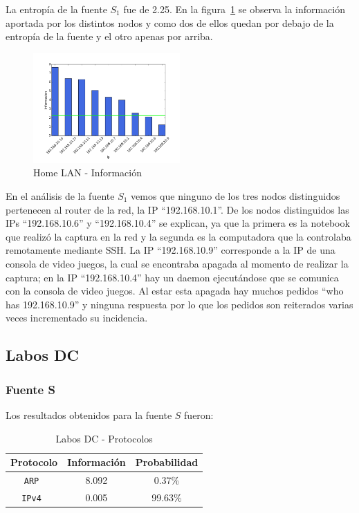 \documentclass[final,inline,narroweqnarray,a4paper]{ieee}
\begin{document}
La entropía de la fuente $S_1$ fue de 2.25. En la figura~\ref{histo:homelanS1} se observa la información aportada por los distintos nodos y como dos de ellos quedan por debajo de la entropía de la fuente y el otro apenas por arriba. 

\begin{figure}[H]
    \begin{center}
        \includegraphics[width=0.5\textwidth]{plot/homelanS1-bar.png}
        \caption{Home LAN - Información}
        \label{histo:homelanS1}
    \end{center}
\end{figure}

En el análisis de la fuente $S_1$ vemos que ninguno de los tres nodos distinguidos pertenecen al router de la red, la IP ``192.168.10.1''. De los nodos distinguidos las IPs ``192.168.10.6'' y ``192.168.10.4'' se explican, ya que la primera es la notebook que realizó la captura en la red y la segunda es la computadora que la controlaba remotamente mediante SSH. La IP ``192.168.10.9'' corresponde a la IP de una consola de video juegos, la cual se encontraba apagada al momento de realizar la captura; en la IP ``192.168.10.4'' hay un daemon ejecutándose que se comunica con la consola de video juegos. Al estar esta apagada hay muchos pedidos ``who has 192.168.10.9'' y ninguna respuesta por lo que los pedidos son reiterados varias veces incrementado su incidencia.

\subsection{Labos DC}
\subsubsection{Fuente S}

Los resultados obtenidos para la fuente $S$ fueron:

\begin{table}[H]
    \begin{center}
        \begin{tabular}{|c|c|c|}
            \hline
            \textbf{Protocolo} & \textbf{Información} & \textbf{Probabilidad} \\ \hline
            \texttt{ARP       }& 8.092        & 0.37\%     \\ \hline
            \texttt{IPv4      }& 0.005        & 99.63\%    \\ \hline
        \end{tabular}
        \caption{Labos DC - Protocolos}
        \label{table:labosDcS}
    \end{center}
\end{table} 
\end{document}

